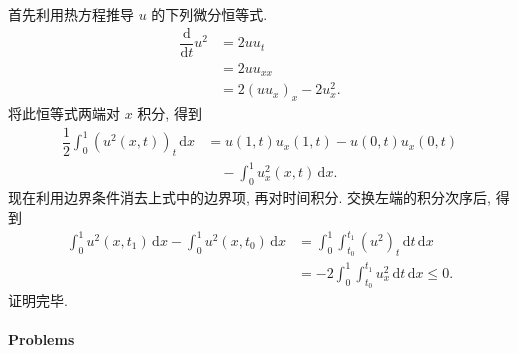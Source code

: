 \begin{Proof}
首先利用热方程推导 $u$ 的下列微分恒等式.
\begin{equation}\label{eq:heat-pointwise-energy-identity}
\begin{aligned}
\dfrac{\mathrm{d}}{\mathrm{d}t}u^2&=2uu_t\\
&=2uu_{xx}\\
&=2(uu_x)_x-2u_x^2.
\end{aligned}
\end{equation}
将此恒等式两端对 $x$ 积分, 得到
\begin{equation}\label{eq:heat-integrated-energy-identity}
\begin{aligned}
\dfrac12\int_0^1(u^2(x,t))_t\,\mathrm{d}x
&=u(1,t)u_x(1,t)-u(0,t)u_x(0,t)\\
&\quad-\int_0^1u_x^2(x,t)\,\mathrm{d}x.
\end{aligned}
\end{equation}
现在利用边界条件消去上式中的边界项, 再对时间积分. 交换左端的积分次序后, 得到
\begin{equation}\label{eq:heat-energy-dissipation}
\begin{aligned}
\int_0^1u^2(x,t_1)\,\mathrm{d}x-\int_0^1u^2(x,t_0)\,\mathrm{d}x
&=\int_0^1\int_{t_0}^{t_1}(u^2)_t\,\mathrm{d}t\,\mathrm{d}x\\
&=-2\int_0^1\int_{t_0}^{t_1}u_x^2\,\mathrm{d}t\,\mathrm{d}x\leq0.
\end{aligned}
\end{equation}
证明完毕.
\end{Proof}

\paragraph*{Problems}


